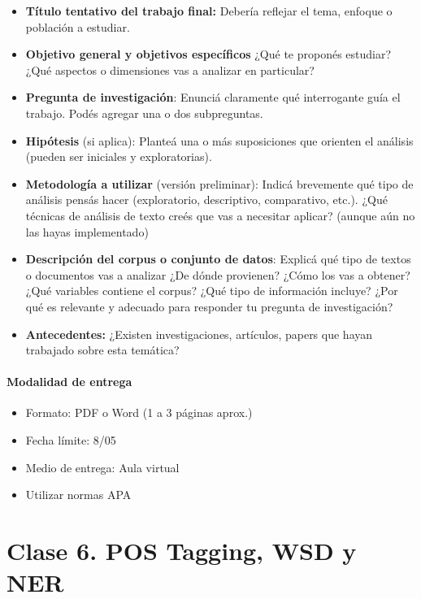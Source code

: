 \documentclass[
  letterpaper,
  DIV=11,
  numbers=noendperiod]{scrreprt}
\providecommand{\tightlist}{%
  \setlength{\itemsep}{0pt}\setlength{\parskip}{0pt}}
\begin{document}
\begin{itemize}
\tightlist
\item
  \textbf{Título tentativo del trabajo final:} Debería reflejar el tema,
  enfoque o población a estudiar.
\item
  \textbf{Objetivo general y objetivos específicos} ¿Qué te proponés
  estudiar? ¿Qué aspectos o dimensiones vas a analizar en particular?
\item
  \textbf{Pregunta de investigación}: Enunciá claramente qué
  interrogante guía el trabajo. Podés agregar una o dos subpreguntas.
\item
  \textbf{Hipótesis} (si aplica): Planteá una o más suposiciones que
  orienten el análisis (pueden ser iniciales y exploratorias).
\item
  \textbf{Metodología a utilizar} (versión preliminar): Indicá
  brevemente qué tipo de análisis pensás hacer (exploratorio,
  descriptivo, comparativo, etc.). ¿Qué técnicas de análisis de texto
  creés que vas a necesitar aplicar? (aunque aún no las hayas
  implementado)
\item
  \textbf{Descripción del corpus o conjunto de datos}: Explicá qué tipo
  de textos o documentos vas a analizar ¿De dónde provienen? ¿Cómo los
  vas a obtener? ¿Qué variables contiene el corpus? ¿Qué tipo de
  información incluye? ¿Por qué es relevante y adecuado para responder
  tu pregunta de investigación?
\item
  \textbf{Antecedentes:} ¿Existen investigaciones, artículos, papers que
  hayan trabajado sobre esta temática?
\end{itemize}

\subsection{Modalidad de entrega}\label{modalidad-de-entrega}

\begin{itemize}
\item
  Formato: PDF o Word (1 a 3 páginas aprox.)
\item
  Fecha límite: 8/05
\item
  Medio de entrega: Aula virtual
\item
  Utilizar normas APA
\end{itemize}

\part{Clase 6. POS Tagging, WSD y NER}
\end{document}
